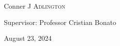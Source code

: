 \begin{titlepage}
\begin{minipage}{0.8\textwidth}
    \large
    \begin{center}    
Conner J \textsc{Adlington}\\ %
\vspace{1cm}

Supervisor: Professor Cristian Bonato\\
\vspace{1cm}

{\large August 23, 2024}\\[2cm] %
\end{center}
\end{minipage}




\vfill %

\end{titlepage}



